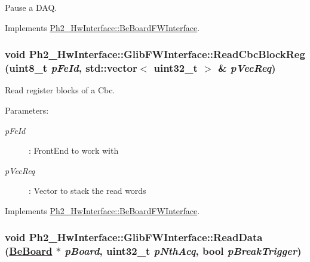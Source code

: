 Pause a DAQ. 



Implements \hyperlink{class_ph2___hw_interface_1_1_be_board_f_w_interface_a943bad9e1dc079d2f4244f749695bd1}{Ph2\_\-Hw\-Interface::Be\-Board\-FWInterface}.\hypertarget{class_ph2___hw_interface_1_1_glib_f_w_interface_9dbc3cf2a991126aed53d834d4d152ce}{
\subsubsection[ReadCbcBlockReg]{\setlength{\rightskip}{0pt plus 5cm}void Ph2\_\-Hw\-Interface::Glib\-FWInterface::Read\-Cbc\-Block\-Reg (uint8\_\-t {\em p\-Fe\-Id}, std::vector$<$ uint32\_\-t $>$ \& {\em p\-Vec\-Req})}}
\label{class_ph2___hw_interface_1_1_glib_f_w_interface_9dbc3cf2a991126aed53d834d4d152ce}


Read register blocks of a Cbc. 

\begin{Desc}
\item[Parameters:]
\begin{description}
\item[{\em p\-Fe\-Id}]: Front\-End to work with \item[{\em p\-Vec\-Req}]: Vector to stack the read words \end{description}
\end{Desc}


Implements \hyperlink{class_ph2___hw_interface_1_1_be_board_f_w_interface_c88ca7560104bf438fb1e57f1ce089f1}{Ph2\_\-Hw\-Interface::Be\-Board\-FWInterface}.\hypertarget{class_ph2___hw_interface_1_1_glib_f_w_interface_26c35fec3518f40d09ebc7f0114be19b}{
\subsubsection[ReadData]{\setlength{\rightskip}{0pt plus 5cm}void Ph2\_\-Hw\-Interface::Glib\-FWInterface::Read\-Data (\hyperlink{class_ph2___hw_description_1_1_be_board}{Be\-Board} $\ast$ {\em p\-Board}, uint32\_\-t {\em p\-Nth\-Acq}, bool {\em p\-Break\-Trigger})}}
\label{class_ph2___hw_interface_1_1_glib_f_w_interface_26c35fec3518f40d09ebc7f0114be19b}


